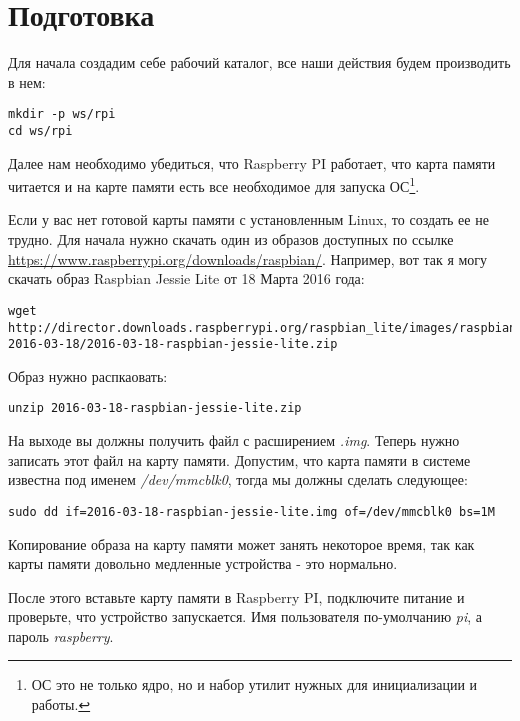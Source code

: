 \section{Подготовка}

Для начала создадим себе рабочий каталог, все наши действия будем производить в
нем:
\begin{lstlisting}
mkdir -p ws/rpi
cd ws/rpi
\end{lstlisting}

Далее нам необходимо убедиться, что Raspberry PI работает, что карта памяти
читается и на карте памяти есть все необходимое для запуска ОС\footnote{ОС это
не только ядро, но и набор утилит нужных для инициализации и работы.}.

Если у вас нет готовой карты памяти с установленным Linux, то создать ее не
трудно. Для начала нужно скачать один из образов доступных по ссылке
\url{https://www.raspberrypi.org/downloads/raspbian/}. Например, вот так я могу
скачать образ Raspbian Jessie Lite от 18 Марта 2016 года:
\begin{lstlisting}
wget http://director.downloads.raspberrypi.org/raspbian_lite/images/raspbian_lite-2016-03-18/2016-03-18-raspbian-jessie-lite.zip
\end{lstlisting}

Образ нужно распкаовать:
\begin{lstlisting}
unzip 2016-03-18-raspbian-jessie-lite.zip
\end{lstlisting}

На выходе вы должны получить файл с расширением \emph{.img}. Теперь нужно
записать этот файл на карту памяти. Допустим, что карта памяти в системе
известна под именем \emph{/dev/mmcblk0}, тогда мы должны сделать следующее:

\begin{lstlisting}
sudo dd if=2016-03-18-raspbian-jessie-lite.img of=/dev/mmcblk0 bs=1M
\end{lstlisting}

Копирование образа на карту памяти может занять некоторое время, так как карты
памяти довольно медленные устройства - это нормально.

После этого вставьте карту памяти в Raspberry PI, подключите питание и
проверьте, что устройство запускается. Имя пользователя по-умолчанию \emph{pi},
а пароль \emph{raspberry}.
